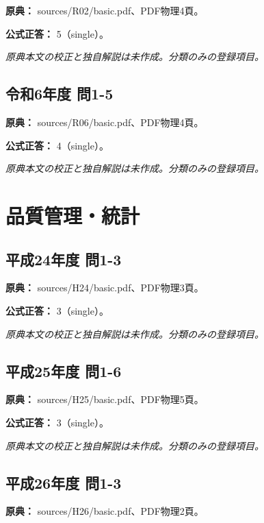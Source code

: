 \noindent\textbf{原典：} sources/R02/basic.pdf、PDF物理4頁。

\textbf{公式正答：} 5（single）。

\par\textit{原典本文の校正と独自解説は未作成。分類のみの登録項目。}

\subsection{令和6年度 問1-5}
\label{q:r06-reg-basic-1-5}

\noindent\textbf{原典：} sources/R06/basic.pdf、PDF物理4頁。

\textbf{公式正答：} 4（single）。

\par\textit{原典本文の校正と独自解説は未作成。分類のみの登録項目。}

\section{品質管理・統計}

\subsection{平成24年度 問1-3}
\label{q:h24-reg-basic-1-3}

\noindent\textbf{原典：} sources/H24/basic.pdf、PDF物理3頁。

\textbf{公式正答：} 3（single）。

\par\textit{原典本文の校正と独自解説は未作成。分類のみの登録項目。}

\subsection{平成25年度 問1-6}
\label{q:h25-reg-basic-1-6}

\noindent\textbf{原典：} sources/H25/basic.pdf、PDF物理5頁。

\textbf{公式正答：} 3（single）。

\par\textit{原典本文の校正と独自解説は未作成。分類のみの登録項目。}

\subsection{平成26年度 問1-3}
\label{q:h26-reg-basic-1-3}

\noindent\textbf{原典：} sources/H26/basic.pdf、PDF物理2頁。

